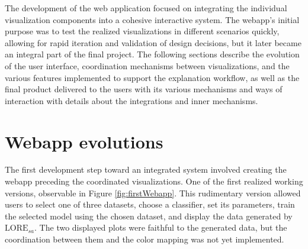 

The development of the web application focused on integrating the individual visualization components into a cohesive interactive system. The webapp's initial purpose was to test the realized visualizations in different scenarios quickly, allowing for rapid iteration and validation of design decisions, but it later became an integral part of the final project. The following sections describe the evolution of the user interface, coordination mechanisms between visualizations, and the various features implemented to support the explanation workflow, as well as the final product delivered to the users with its various mechanisms and ways of interaction with details about the integrations and inner mechanisms.

\section{Webapp evolutions}

The first development step toward an integrated system \cite{git7commit} involved creating the webapp preceding the coordinated visualizations. One of the first realized working versions, observable in Figure \ref{fig:firstWebapp}. This rudimentary version allowed users to select one of three datasets, choose a classifier, set its parameters, train the selected model using the chosen dataset, and display the data generated by $\text{LORE}_{sa}$. The two displayed plots were faithful to the generated data, but the coordination between them and the color mapping was not yet implemented.

